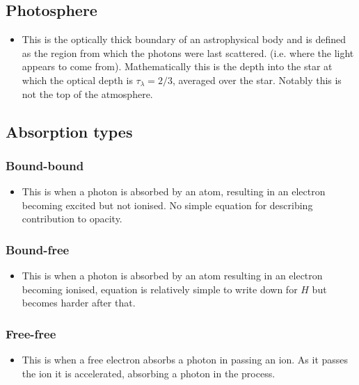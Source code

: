 \documentclass[11pt]{article}
\numberwithin{equation}{section}
\begin{document}
\subsection{Photosphere} 
\begin{itemize}
    \item This is the optically thick boundary of an astrophysical body and is defined as the region from which the photons were last scattered. (i.e. where the light appears to come from). Mathematically this is the depth into the star at which the optical depth is $\tau_{\lambda}=2/3$, averaged over the star.  Notably this is not the top of the atmosphere.  
\end{itemize}

\subsection{Absorption types}
\subsubsection{Bound-bound}
\begin{itemize}
    \item This is when a photon is absorbed by an atom, resulting in an electron becoming excited but not ionised. No simple equation for describing contribution to opacity. 
\end{itemize}
\subsubsection{Bound-free} 
\begin{itemize}
    \item This is when a photon is absorbed by an atom resulting in an electron becoming ionised, equation is relatively simple to write down for $H$ but becomes harder after that. 
\end{itemize}
\subsubsection{Free-free}
\begin{itemize}
    \item This is when a free electron absorbs a photon in passing an ion. As it passes the ion it is accelerated, absorbing a photon in the process. 
\end{itemize}
\end{document}
